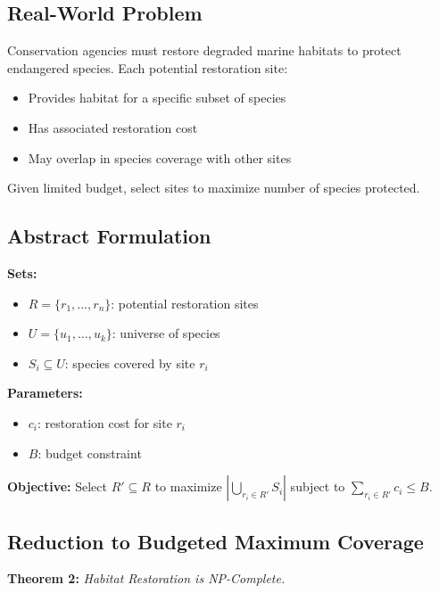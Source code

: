 \documentclass[sigconf,nonacm]{acmart}
\begin{document}
\subsection{Real-World Problem}

Conservation agencies must restore degraded marine habitats to protect endangered species. Each potential restoration site:
\begin{itemize}
    \item Provides habitat for a specific subset of species
    \item Has associated restoration cost
    \item May overlap in species coverage with other sites
\end{itemize}

Given limited budget, select sites to maximize number of species protected.

\subsection{Abstract Formulation}

\textbf{Sets:}
\begin{itemize}
    \item $R = \{r_1, \ldots, r_n\}$: potential restoration sites
    \item $U = \{u_1, \ldots, u_k\}$: universe of species
    \item $S_i \subseteq U$: species covered by site $r_i$
\end{itemize}

\textbf{Parameters:}
\begin{itemize}
    \item $c_i$: restoration cost for site $r_i$
    \item $B$: budget constraint
\end{itemize}

\textbf{Objective:} Select $R' \subseteq R$ to maximize $|\bigcup_{r_i \in R'} S_i|$ subject to $\sum_{r_i \in R'} c_i \leq B$.

\subsection{Reduction to Budgeted Maximum Coverage}

\textbf{Theorem 2:} \textit{Habitat Restoration is NP-Complete.}
\end{document}
